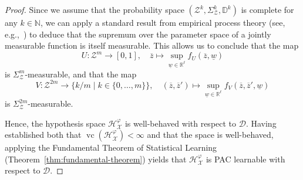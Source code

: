 \begin{proof}
    Since we assume that the probability space $(\mathcal{Z}^k, \Sigma_{\mathcal{Z}}^k, \mathbb{D}^k)$ is complete for any $k \in \mathbb{N}$, we can apply a standard result from empirical process theory (see, e.g.,~\cite[p. 197]{PollardConvergenceOfStochasticProcesses}) to deduce that the supremum over the parameter space of a jointly measurable function is itself measurable. This allows us to conclude that the map
    \[
        U: \mathcal{Z}^m \to [0,1], \quad \overline{z} \mapsto \sup_{\underline{w} \in \mathbb{R}^\ell} f_U(\overline{z}, \underline{w})
    \]
    is $\Sigma_{\mathcal{Z}}^m$-measurable, and that the map
    \[
        V: \mathcal{Z}^{2m} \to \{k/m \mid k \in \{0, \dots, m\}\}, \quad (\overline{z}, \overline{z}') \mapsto \sup_{\underline{w} \in \mathbb{R}^\ell} f_V(\overline{z}, \overline{z}', \underline{w})
    \]
    is $\Sigma_{\mathcal{Z}}^{2m}$-measurable.

    Hence, the hypothesis space $\mathcal{H}_\mathcal{X}^\varphi$ is well-behaved with respect to $\mathcal{D}$. Having established both that $\operatorname{vc}(\mathcal{H}_\mathcal{X}^\varphi) < \infty$ and that the space is well-behaved, applying the Fundamental Theorem of Statistical Learning (Theorem~\ref{thm:fundamental-theorem}) yields that $\mathcal{H}_\mathcal{X}^\varphi$ is PAC learnable with respect to $\mathcal{D}$.
\end{proof}